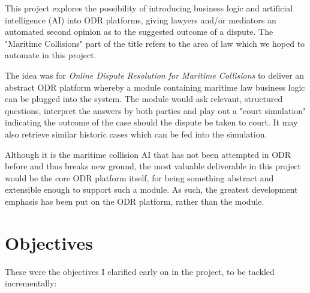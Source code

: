 This project explores the possibility of introducing business logic and artificial intelligence (AI) into ODR platforms, giving lawyers and/or mediators an automated second opinion as to the suggested outcome of a dispute. The "Maritime Collisions" part of the title refers to the area of law which we hoped to automate in this project.

The idea was for \emph{Online Dispute Resolution for Maritime Collisions} to deliver an abstract ODR platform whereby a module containing maritime law business logic can be plugged into the system. The module would ask relevant, structured questions, interpret the answers by both parties and play out a "court simulation" indicating the outcome of the case should the dispute be taken to court. It may also retrieve similar historic cases which can be fed into the simulation.

Although it is the maritime collision AI that has not been attempted in ODR before and thus breaks new ground, the most valuable deliverable in this project would be the core ODR platform itself, for being something abstract and extensible enough to support such a module. As such, the greatest development emphasis has been put on the ODR platform, rather than the module.

\section{Objectives}

These were the objectives I clarified early on in the project, to be tackled incrementally:

